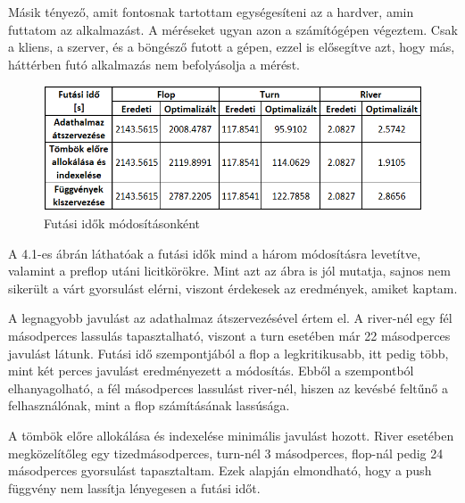 Másik tényező, amit fontosnak tartottam egységesíteni az a hardver, amin futtatom az alkalmazást. A méréseket ugyan azon a számítógépen végeztem. Csak a kliens, a szerver, és a böngésző futott a gépen, ezzel is elősegítve azt, hogy más, háttérben futó alkalmazás nem befolyásolja a mérést. 

\begin{figure}[ht]
\centering
\includegraphics[scale=0.85]{images/running-time.png}
\caption{Futási idők módosításonként}
\label{fig:running-time}
\end{figure}

A 4.1-es ábrán láthatóak a futási idők mind a három módosításra levetítve, valamint a preflop utáni licitkörökre. Mint azt az ábra is jól mutatja, sajnos nem sikerült a várt gyorsulást elérni, viszont érdekesek az eredmények, amiket kaptam.

A legnagyobb javulást az adathalmaz átszervezésével értem el. A river-nél egy fél másodperces lassulás tapasztalható, viszont a turn esetében már 22 másodperces javulást látunk. Futási idő szempontjából a flop a legkritikusabb, itt pedig több, mint két perces javulást eredményezett a módosítás. Ebből a szempontból elhanyagolható, a fél másodperces lassulást river-nél, hiszen az kevésbé feltűnő a felhasználónak, mint a flop számításának lassúsága.

A tömbök előre allokálása és indexelése minimális javulást hozott. River esetében megközelítőleg egy tizedmásodperces, turn-nél 3 másodperces, flop-nál pedig 24 másodperces gyorsulást tapasztaltam. Ezek alapján elmondható, hogy a push függvény nem lassítja lényegesen a futási időt.

